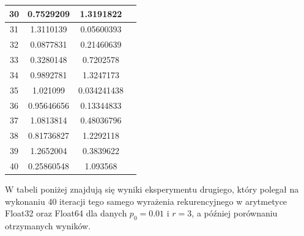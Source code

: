\documentclass[]{article}
\begin{document}
\begin{table}[!h]
\begin{tabular}{|c|c|c|c|}
			30 & 0.7529209    & 1.3191822 \\ \hline
			31 & 1.3110139    & 0.05600393 \\ \hline
			32 & 0.0877831    & 0.21460639 \\ \hline
			33 & 0.3280148    & 0.7202578 \\ \hline
			34 & 0.9892781    & 1.3247173 \\ \hline
			35 & 1.021099     & 0.034241438 \\ \hline
			36 & 0.95646656   & 0.13344833 \\ \hline
			37 & 1.0813814    & 0.48036796 \\ \hline
			38 & 0.81736827   & 1.2292118 \\ \hline
			39 & 1.2652004    & 0.3839622 \\ \hline
			40 & 0.25860548   & 1.093568 \\ \hline
		\end{tabular}
	\end{table}

	\clearpage

	W tabeli poniżej znajdują się wyniki eksperymentu drugiego, który polegał na wykonaniu 40 iteracji tego samego wyrażenia rekurencyjnego w arytmetyce Float32 oraz Float64 dla danych $p_0 = 0.01$ i $r = 3$, a później porównaniu otrzymanych wyników.
\end{document}
